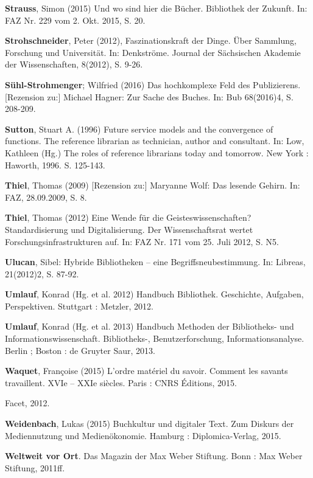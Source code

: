 \documentclass[a4paper,
fontsize=11pt,
oneside,
numbers=noperiodatend,
parskip=half-,
bibliography=totoc,
final
]{scrartcl}
\providecommand{\tightlist}{%
  \setlength{\itemsep}{0pt}\setlength{\parskip}{0pt}}
\begin{document}
\textbf{Strauss}, Simon (2015) Und wo sind hier die Bücher. Bibliothek
der Zukunft. In: FAZ Nr. 229 vom 2. Okt. 2015, S. 20.

\textbf{Strohschneider}, Peter (2012), Faszinationskraft der Dinge. Über
Sammlung, Forschung und Universität. In: Denkströme. Journal der
Sächsischen Akademie der Wissenschaften, 8(2012), S. 9-26.

\textbf{Sühl-Strohmenger}; Wilfried (2016) Das hochkomplexe Feld des
Publizierens. {[}Rezension zu:{]} Michael Hagner: Zur Sache des Buches.
In: Bub 68(2016)4, S. 208-209.

\textbf{Sutton}, Stuart A. (1996) Future service models and the
convergence of functions. The reference librarian as technician, author
and consultant. In: Low, Kathleen (Hg.) The roles of reference
librarians today and tomorrow. New York : Haworth, 1996. S. 125-143.

\textbf{Thiel}, Thomas (2009) {[}Rezension zu:{]} Maryanne Wolf: Das
lesende Gehirn. In: FAZ, 28.09.2009, S. 8.

\textbf{Thiel}, Thomas (2012) Eine Wende für die Geisteswissenschaften?
Standardisierung und Digitalisierung. Der Wissenschaftsrat wertet
Forschungsinfrastrukturen auf. In: FAZ Nr. 171 vom 25. Juli 2012, S. N5.

\textbf{Ulucan}, Sibel: Hybride Bibliotheken -- eine
Begriffsneubestimmung. In: Libreas, 21(2012)2, S. 87-92.

\textbf{Umlauf}, Konrad (Hg. et al. 2012) Handbuch Bibliothek.
Geschichte, Aufgaben, Perspektiven. Stuttgart : Metzler, 2012.

\textbf{Umlauf}, Konrad (Hg. et al. 2013) Handbuch Methoden der
Bibliotheks- und Informationswissenschaft. Bibliotheks-,
Benutzerforschung, Informationsanalyse. Berlin ; Boston : de Gruyter
Saur, 2013.

\textbf{Waquet}, Françoise (2015) L'ordre matériel du savoir. Comment
les savants travaillent. XVIe -- XXIe siècles. Paris : CNRS Éditions,
2015.

\begin{description}
\tightlist
\item[\textbf{Warwick}, Claire (Hg. 2012), Digital Humanities in
practice. London]
Facet, 2012.
\end{description}

\textbf{Weidenbach}, Lukas (2015) Buchkultur und digitaler Text. Zum
Diskurs der Mediennutzung und Medienökonomie. Hamburg :
Diplomica-Verlag, 2015.

\textbf{Weltweit vor Ort}. Das Magazin der Max Weber Stiftung. Bonn :
Max Weber Stiftung, 2011ff.
\end{document}
